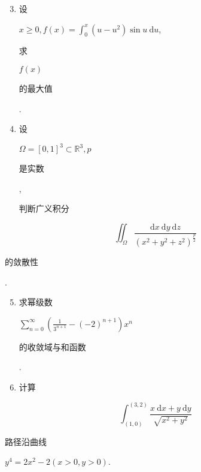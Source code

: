 \documentclass[10pt]{article}
\begin{document}
\begin{enumerate}
  \setcounter{enumi}{2}
  \item \begin{CJK}{UTF8}{mj}设\end{CJK} $x \geqslant 0, f(x)=\int_{0}^{x}\left(u-u^{2}\right) \sin u \mathrm{~d} u$, \begin{CJK}{UTF8}{mj}求\end{CJK} $f(x)$ \begin{CJK}{UTF8}{mj}的最大值\end{CJK}.

  \item \begin{CJK}{UTF8}{mj}设\end{CJK} $\Omega=[0,1]^{3} \subset \mathbb{R}^{3}, p$ \begin{CJK}{UTF8}{mj}是实数\end{CJK}, \begin{CJK}{UTF8}{mj}判断广义积分\end{CJK}

\end{enumerate}
$$
\iint_{\Omega} \frac{\mathrm{d} x \mathrm{~d} y \mathrm{~d} z}{\left(x^{2}+y^{2}+z^{2}\right)^{\frac{p}{2}}}
$$
\begin{CJK}{UTF8}{mj}的敛散性\end{CJK}.

\begin{enumerate}
  \setcounter{enumi}{4}
  \item \begin{CJK}{UTF8}{mj}求幂级数\end{CJK} $\sum_{n=0}^{\infty}\left(\frac{1}{3^{n+1}}-(-2)^{n+1}\right) x^{n}$ \begin{CJK}{UTF8}{mj}的收敛域与和函数\end{CJK}.

  \item \begin{CJK}{UTF8}{mj}计算\end{CJK}

\end{enumerate}
$$
\int_{(1,0)}^{(3,2)} \frac{x \mathrm{~d} x+y \mathrm{~d} y}{\sqrt{x^{2}+y^{2}}}
$$
\begin{CJK}{UTF8}{mj}路径沿曲线\end{CJK} $y^{4}=2 x^{2}-2(x>0, y>0)$.
\end{document}
